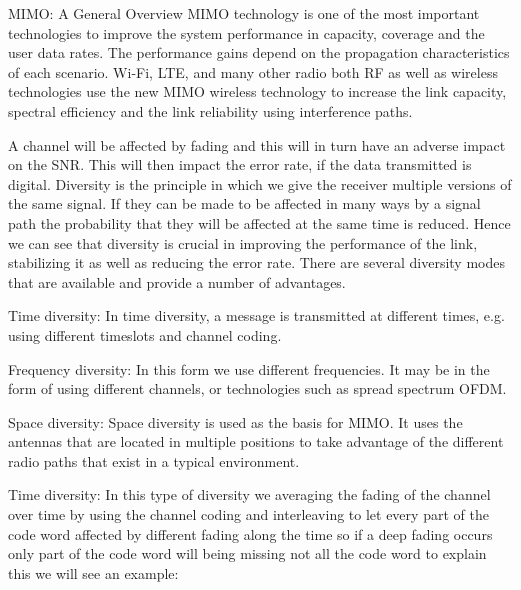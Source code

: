 
MIMO: A General Overview
MIMO technology is one of the most important technologies to improve the system performance in capacity, coverage and the user data rates. The performance gains depend on the propagation characteristics of each scenario. Wi-Fi, LTE, and many other radio both RF as well as wireless technologies use the new MIMO wireless technology to increase the link capacity, spectral efficiency and the link reliability using interference paths.

A channel will be affected by fading and this will in turn have an adverse impact on the SNR. This will then impact the error rate, if the data transmitted is digital. Diversity is the principle in which we give the receiver multiple versions of the same signal. If they can be made to be affected in many ways by a signal path the probability that they will be affected at the same time is reduced. Hence we can see that diversity is crucial in improving the performance of the link, stabilizing it as well as reducing the error rate. 
There are several diversity modes that are available and provide a number of advantages. 

	Time diversity: In time diversity, a message is transmitted at different times, e.g. using different timeslots and channel coding. 

	Frequency diversity: In this form we use different frequencies. It may be in the form of using different channels, or technologies such as spread spectrum OFDM. 

	Space diversity: Space diversity is used as the basis for MIMO. It uses the antennas that are located in multiple positions to take advantage of the different radio paths that exist in a typical environment. 

Time diversity:
In this type of diversity we averaging the fading of the channel over time by using the channel coding and interleaving to let every part of the code word affected by different fading along the time so if a deep fading occurs only part of the code word will being missing not all the code word to explain this we will see an example:















